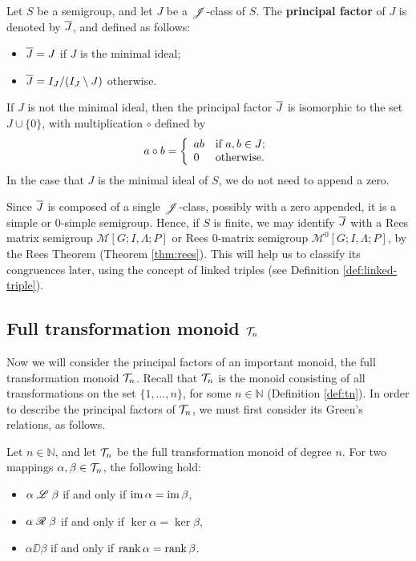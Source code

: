 \begin{definition}
  \label{def:princfact}
  Let $S$ be a semigroup, and let $J$ be a $\mathrel{\mathscr{J}}$-class of $S$.  The
  \textbf{principal factor} of $J$ is denoted by $\overline{J}$, and defined as
  follows:
  \begin{itemize}
  \item $\overline{J} = J$ if $J$ is the minimal ideal;
  \item $\overline{J} = I_J / (I_J \setminus J)$ otherwise.
  \end{itemize}
\end{definition}

If $J$ is not the minimal ideal, then the principal factor $\overline{J}$ is
isomorphic to the set $J \cup \{0\}$, with multiplication $\circ$ defined by
$$a \circ b = \left\{
  \begin{array}{l l}
    ab & \text{if~} a,b \in J; \\
    0 & \text{otherwise}.
  \end{array}\right.$$
In the case that $J$ is the minimal ideal of $S$, we do not need to append a
zero.

Since $\overline{J}$ is composed of a single $\mathrel{\mathscr{J}}$-class, possibly with a zero
appended, it is a simple or 0-simple semigroup.  Hence, if $S$ is finite, we may
identify $\overline{J}$ with a Rees matrix semigroup $\mathcal{M}[G;I,\Lambda;P]$ or
Rees 0-matrix semigroup $\mathcal{M}^0[G;I,\Lambda;P]$, by the Rees Theorem
(Theorem \ref{thm:rees}).  This will help us to classify its congruences later,
using the concept of linked triples (see Definition \ref{def:linked-triple}).

\subsection{Full transformation monoid $\mathcal{T}_n$}
\label{sec:princfact-tn}

Now we will consider the principal factors of an important monoid, the full
transformation monoid $\mathcal{T}_n$.  Recall that $\mathcal{T}_n$ is the monoid consisting of
all transformations on the set $\{1, \dots, n\}$, for some $n \in \mathbb{N}$
(Definition \ref{def:tn}).  In order to describe the principal factors of
$\mathcal{T}_n$, we must first consider its Green's relations, as follows.

\begin{proposition}
  \label{prop:tn-greens}
  Let $n \in \mathbb{N}$, and let $\mathcal{T}_n$ be the full transformation monoid of
  degree $n$.  For two mappings $\alpha, \beta \in \mathcal{T}_n$, the following hold:
  \begin{itemize}
  \item $\alpha \mathrel{\mathscr{L}} \beta$ if and only if $\operatorname{im} \alpha = \operatorname{im} \beta$,
  \item $\alpha \mathrel{\mathscr{R}} \beta$ if and only if $\ker \alpha = \ker \beta$,
  \item $\alpha \DD \beta$ if and only if $\operatorname{rank} \alpha = \operatorname{rank} \beta$.
  \end{itemize}
\end{proposition}

